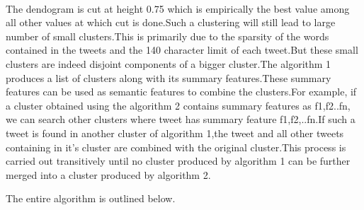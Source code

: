 	\\
	\par
	The dendogram is cut at height 0.75 which is empirically the best value among all other values at which cut is done.Such a clustering will still lead to large number of small clusters.This is primarily due to the sparsity of the words contained in the tweets and the 140 character limit of each tweet.But these small clusters are indeed disjoint components of a bigger cluster.The algorithm 1 produces a list of clusters along with its summary features.These summary features can be used as semantic features to combine the clusters.For example, if a cluster obtained using the algorithm 2 contains summary features as f1,f2..fn, we can search other clusters where tweet has summary feature f1,f2,..fn.If such a tweet is found in another cluster of algorithm 1,the tweet and all other tweets containing in it's cluster are combined with the original cluster.This process is carried out transitively until no cluster produced by algorithm 1 can be further merged into a cluster produced by algorithm 2.	
	\\
	\par
	The entire algorithm is outlined below.
	

